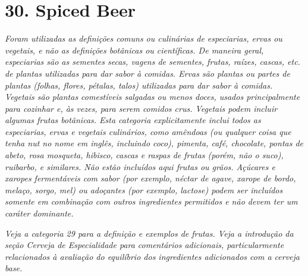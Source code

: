 \section*{30. Spiced Beer}
\textit{Foram utilizadas as definições comuns ou culinárias de especiarias, ervas ou vegetais, e não as definições botânicas ou científicas. De maneira geral, especiarias são as sementes secas, vagens de sementes, frutas, raízes, cascas, etc. de plantas utilizadas para dar sabor à comidas. Ervas são plantas ou partes de plantas (folhas, flores, pétalas, talos) utilizadas para dar sabor à comidas. Vegetais são plantas comestíveis salgadas ou menos doces, usados principalmente para cozinhar e, às vezes, para serem comidos crus. Vegetais podem incluir algumas frutas botânicas. Esta categoria explicitamente inclui todos as especiarias, ervas e vegetais culinários, como amêndoas (ou qualquer coisa que tenha nut no nome em inglês, incluindo coco), pimenta, café, chocolate, pontas de abeto, rosa mosqueta, hibisco, cascas e raspas de frutas (porém, não o suco), ruibarbo, e similares. Não estão incluídos aqui frutas ou grãos. Açúcares e xaropes fermentáveis com sabor (por exemplo, néctar de agave, xarope de bordo, melaço, sorgo, mel) ou adoçantes (por exemplo, lactose) podem ser incluídos somente em combinação com outros ingredientes permitidos e não devem ter um caráter dominante.}

\textit{Veja a categoria 29 para a definição e exemplos de frutas. Veja a introdução da seção Cerveja de Especialidade para comentários adicionais, particularmente relacionados à avaliação do equilíbrio dos ingredientes adicionados com a cerveja base.}

